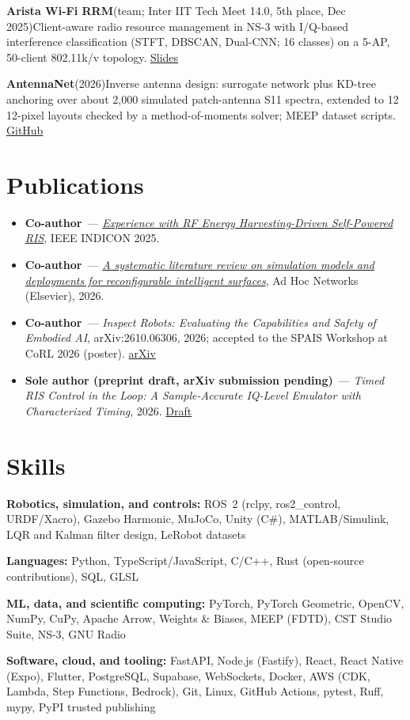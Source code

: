 \documentclass[10pt,a4paper]{article}
\newcommand{\project}[3]{%
  \par\vspace{0.1em}%
  \noindent\textbf{#1}{\color{textlight}\enspace(#2)}\enspace#3\par
}
\begin{document}
\project{Arista Wi-Fi RRM}{team; Inter IIT Tech Meet 14.0, 5th place, Dec 2025}{Client-aware radio resource management in NS-3 with I/Q-based interference classification (STFT, DBSCAN, Dual-CNN; 16 classes) on a 5-AP, 50-client 802.11k/v topology. \href{https://canva.link/puoqbe4okoid8rb}{Slides}}

\project{AntennaNet}{2026}{Inverse antenna design: surrogate network plus KD-tree anchoring over about 2,000 simulated patch-antenna S11 spectra, extended to 12\,\texttimes\,12-pixel layouts checked by a method-of-moments solver; MEEP dataset scripts. \href{https://github.com/Galabavamsi/Antenna-Net}{GitHub}}
\section*{Publications}
\begin{itemize}
  \item \textbf{Co-author}~--- \href{https://ieeexplore.ieee.org/abstract/document/11392908/}{\textit{Experience with RF Energy Harvesting-Driven Self-Powered RIS}}, IEEE INDICON 2025.
  \item \textbf{Co-author}~--- \href{https://www.sciencedirect.com/science/article/pii/S1570870526001964}{\textit{A systematic literature review on simulation models and deployments for reconfigurable intelligent surfaces}}, Ad Hoc Networks (Elsevier), 2026.
  \item \textbf{Co-author}~--- \textit{Inspect Robots: Evaluating the Capabilities and Safety of Embodied AI}, arXiv:2610.06306, 2026; accepted to the SPAIS Workshop at CoRL 2026 (poster). \href{https://arxiv.org/abs/2610.06306}{arXiv}
  \item \textbf{Sole author (preprint draft, arXiv submission pending)}~--- \textit{Timed RIS Control in the Loop: A Sample-Accurate IQ-Level Emulator with Characterized Timing}, 2026. \href{https://github.com/Galabavamsi/sremu-paper/blob/master/preprint/sremu-preprint-draft.pdf}{Draft}
\end{itemize}

\section*{Skills}
{\raggedright{}
\textbf{Robotics, simulation, and controls:} ROS~2 (rclpy, ros2\_control, URDF/Xacro), Gazebo Harmonic, MuJoCo, Unity (C\#), MATLAB/Simulink, LQR and Kalman filter design, LeRobot datasets\par
\textbf{Languages:} Python, TypeScript/JavaScript, C/C++, Rust (open-source contributions), SQL, GLSL\par
\textbf{ML, data, and scientific computing:} PyTorch, PyTorch Geometric, OpenCV, NumPy, CuPy, Apache Arrow, Weights \& Biases, MEEP (FDTD), CST Studio Suite, NS-3, GNU Radio\par
\textbf{Software, cloud, and tooling:} FastAPI, Node.js (Fastify), React, React Native (Expo), Flutter, PostgreSQL, Supabase, WebSockets, Docker, AWS (CDK, Lambda, Step Functions, Bedrock), Git, Linux, GitHub Actions, pytest, Ruff, mypy, PyPI trusted publishing\par}
\end{document}
